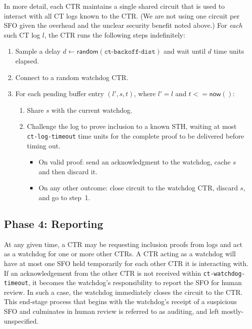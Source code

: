In more detail, each CTR maintains a single shared circuit that is used to
interact with all CT logs known to the CTR\@. (We are not using one circuit per
SFO given the overhead and the unclear security benefit noted above.) For
\emph{each} such CT log $l$, the CTR runs the following steps indefinitely:
\begin{enumerate}
    \item\label{enm:auditing:backoff} Sample a delay $d \gets
        \mathsf{random}(\texttt{ct-backoff-dist})$ and wait until $d$ time units
        elapsed.
    \item Connect to a random watchdog CTR\@.
    \item\label{enm:auditing:loop} For each pending buffer entry $(l',s,t)$,
    where $l' = l$ and $t <= \mathsf{now}()$:
		\begin{enumerate}
			\item\label{enm:ext:auditing:watchdog} Share $s$ with the current
				watchdog.
			\item\label{enm:ext:auditing:challenge} Challenge the log to prove
                                  inclusion to a known STH, waiting at most
                                  \texttt{ct-log-timeout} time units for the
                                  complete proof to be delivered before timing
                                  out.
				\begin{itemize}
					\item\label{enm:ext:auditing:challenge:success} On valid
						proof: send an acknowledgment to the watchdog, cache $s$
						and then discard it.
					\item\label{enm:ext:auditing:challenge:fail} On any other
						outcome: close circuit to the watchdog CTR, discard $s$,
						and go to step~1.
				\end{itemize}
		\end{enumerate}
\end{enumerate}

\subsection{Phase 4: Reporting}

At any given time, a CTR may be requesting inclusion proofs from logs and act as
a watchdog for one or more other CTRs. A CTR acting as a watchdog will have at
most one SFO held temporarily for each other CTR it is interacting with. If an
acknowledgement from the other CTR is not received within
\texttt{ct-watchdog-timeout}, it becomes the watchdog's responsibility to report
the SFO for human review. In such a case, the watchdog immediately closes the
circuit to the CTR. This end-stage process that begins with the watchdog's
receipt of a suspicious SFO and culminates in human review is referred to as
auditing, and left mostly-unspecified.

